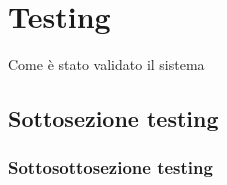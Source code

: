 \chapter{Testing}
\label{sec:testing}
Come è stato validato il sistema

\section{Sottosezione testing}
\label{sec:nomesottosezione2}


\subsection{Sottosottosezione testing}
\label{sec:nomesottosottosezione}

